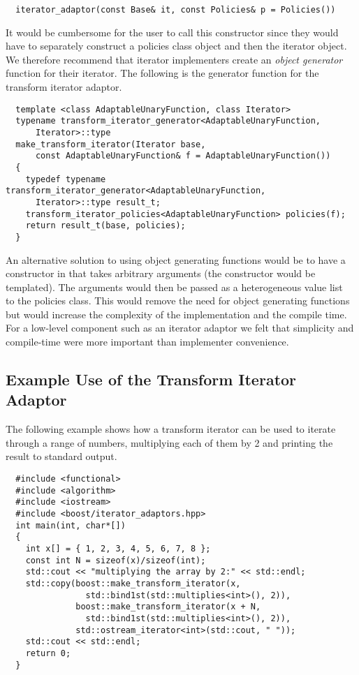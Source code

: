 \documentclass{netobjectdays}
\begin{document}
{\footnotesize
\begin{verbatim}
  iterator_adaptor(const Base& it, const Policies& p = Policies())
\end{verbatim}
}

It would be cumbersome for the user to call this constructor since
they would have to separately construct a policies class object and
then the iterator object. We therefore recommend that iterator
implementers create an \emph{object generator} function for their
iterator. The following is the generator function for the transform
iterator adaptor.

{\footnotesize
\begin{verbatim}
  template <class AdaptableUnaryFunction, class Iterator>
  typename transform_iterator_generator<AdaptableUnaryFunction,
      Iterator>::type
  make_transform_iterator(Iterator base,
      const AdaptableUnaryFunction& f = AdaptableUnaryFunction())
  {
    typedef typename transform_iterator_generator<AdaptableUnaryFunction,
      Iterator>::type result_t;
    transform_iterator_policies<AdaptableUnaryFunction> policies(f);
    return result_t(base, policies);
  }
\end{verbatim}
}

An alternative solution to using object generating functions would be
to have a constructor in  that takes arbitrary
arguments (the constructor would be templated). The arguments would
then be passed as a heterogeneous value list~\cite{TMPW00:Eisenecker}
to the policies class. This would remove the need for object
generating functions but would increase the complexity of the
implementation and the compile time. For a low-level component such as
an iterator adaptor we felt that simplicity and compile-time were more
important than implementer convenience.

\subsection{Example Use of the Transform Iterator Adaptor}

The following example shows how a transform iterator can be used to
iterate through a range of numbers, multiplying each of them by 2 and
printing the result to standard output.

{\footnotesize
\begin{verbatim}
  #include <functional>
  #include <algorithm>
  #include <iostream>
  #include <boost/iterator_adaptors.hpp>
  int main(int, char*[])
  {
    int x[] = { 1, 2, 3, 4, 5, 6, 7, 8 };
    const int N = sizeof(x)/sizeof(int);
    std::cout << "multiplying the array by 2:" << std::endl;
    std::copy(boost::make_transform_iterator(x, 
                std::bind1st(std::multiplies<int>(), 2)),
              boost::make_transform_iterator(x + N, 
                std::bind1st(std::multiplies<int>(), 2)),
              std::ostream_iterator<int>(std::cout, " "));
    std::cout << std::endl;
    return 0;
  }
\end{verbatim}
}
\end{document}
